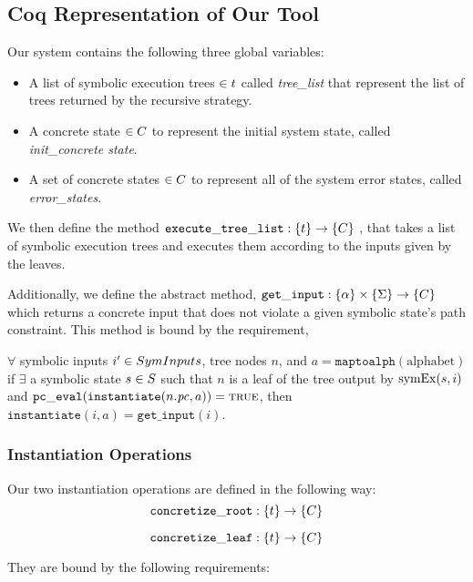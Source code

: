 \subsection{Coq Representation of Our Tool}
Our system contains the following three global variables:
\begin{itemize}
\item A list of symbolic execution trees $\in t$ called \textit{tree\_list} that represent the list of trees returned by the recursive strategy.
\item A concrete state $\in C$ to represent the initial system state, called \textit{init\_concrete state}.
\item A set of concrete states $\in C$ to represent all of the system error states, called \textit{error\_states}.
\end{itemize}

We then define the method $ \mathtt{execute\_tree\_list} : \{t\} \rightarrow \{C\}$ , that takes a list of symbolic execution trees and executes them according to the inputs given by the leaves.

Additionally, we define the abstract method, $ \mathtt{get\_input} : \{\alpha\} \times \{\Sigma\} \rightarrow \{C\}$ which returns a concrete input that does not violate a given symbolic state's path constraint.
This method is bound by the requirement,

\begin{definition}
$ \forall$ symbolic inputs $i' \in SymInputs$, tree nodes $n$, and $a = \mathtt{maptoalph}(\mathrm{alphabet})$
if $\exists$ a symbolic state $s \in S$  such that
$n$ is a leaf of the tree output by $\mathrm{symEx}(s, i)$ and 
$\mathtt{pc\_eval} (\mathtt{instantiate} (n.\mathit{pc}, a)) = \mathtt{\textsc{true}}$, then
$\mathtt{instantiate}(i, a) = \mathtt{get\_input}(i)$.
\end{definition}

\subsubsection{Instantiation Operations}

Our two instantiation operations are defined in the following way: 
$$\mathtt{concretize\_root} : \{ t \} \rightarrow \{C\}$$

$$\mathtt{concretize\_leaf} : \{ t \} \rightarrow \{C\}$$

They are bound by the following requirements:

